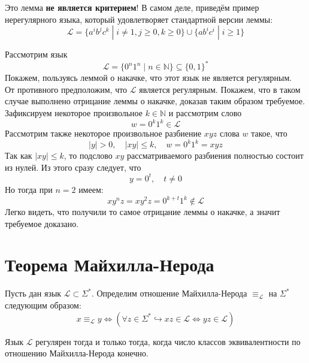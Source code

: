 \documentclass[11pt]{article}
\begin{document}
\begin{remark}
    Это лемма \textbf{не является критерием}! В самом деле, приведём пример нерегулярного языка, который удовлетворяет стандартной версии леммы:
    \[\mathcal{L} = \{a^ib^jc^k \; | \; i \neq 1, j \geq 0, k \geq 0\} \cup \{ab^ic^i \; | \; i \geq 1\}\]
\end{remark}

\begin{example}
    Рассмотрим язык
    \[\mathcal{L} = \{0^n1^n \; | \; n \in \mathbb{N}\} \subseteq \{0, 1\}^{\ast}\]
    Покажем, пользуясь леммой о накачке, что этот язык не является регулярным. \\
    От противного предположим, что $\mathcal{L}$ является регулярным. Покажем, что в таком случае выполнено отрицание леммы о накачке, доказав таким образом требуемое.
    Зафиксируем некоторое произвольное $k \in \mathbb{N}$ и рассмотрим слово 
    \[w = 0^k1^k \in \mathcal{L}\]
    Рассмотрим также некоторое произвольное разбиение $xyz$ слова $w$ такое, что
    \[\left\lvert y \right\rvert > 0, \quad \left\lvert xy \right\rvert \leq k, \quad w = 0^k1^k = xyz\]
    Так как $\left\lvert xy \right\rvert \leq k$, то подслово $xy$ рассматриваемого разбиения полностью состоит из нулей. Из этого сразу следует, что 
    \[y = 0^t, \quad t \neq 0\]
    Но тогда при $n = 2$ имеем:
    \[xy^nz = xy^2z = 0^{k + t}1^k \not \in \mathcal{L}\]
    Легко видеть, что получили то самое отрицание леммы о накачке, а значит требуемое доказано.
\end{example}

\section{Теорема Майхилла-Нерода}

\begin{definition}
    Пусть дан язык $\mathcal{L} \subset \Sigma^{\ast}$. Определим отношение Майхилла-Нерода $\equiv_{\mathcal{L}}$ на $\Sigma^{\ast}$ следующим образом:
    \[x \equiv_{\mathcal{L}} y \iff (\forall z \in \Sigma^{\ast} \hookrightarrow xz \in \mathcal{L} \iff yz \in \mathcal{L})\]
\end{definition}

\begin{theorem}
    Язык $\mathcal{L}$ регулярен тогда и только тогда, когда число классов эквивалентности по отношению Майхилла-Нерода конечно.
\end{theorem}
\end{document}
